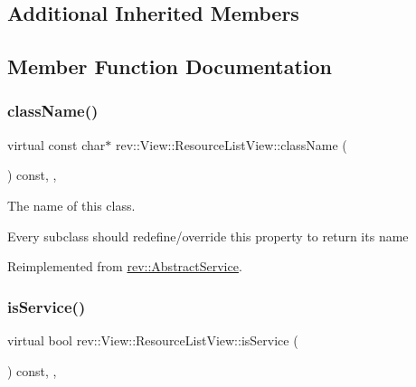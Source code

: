 \subsection*{Additional Inherited Members}


\subsection{Member Function Documentation}
\mbox{\label{classrev_1_1_view_1_1_resource_list_view_a2e12909ec3f4986fb0d2d3edd0987ba6}} 
\subsubsection{\texorpdfstring{className()}{className()}}
{\footnotesize\ttfamily virtual const char$\ast$ rev\+::\+View\+::\+Resource\+List\+View\+::class\+Name (\begin{DoxyParamCaption}{ }\end{DoxyParamCaption}) const\hspace{0.3cm}{\ttfamily [inline]}, {\ttfamily [override]}, {\ttfamily [virtual]}}



The name of this class. 

Every subclass should redefine/override this property to return its name 

Reimplemented from \mbox{\hyperlink{classrev_1_1_abstract_service_a0b64ee4651db7637a70265697ca62453}{rev\+::\+Abstract\+Service}}.

\mbox{\label{classrev_1_1_view_1_1_resource_list_view_a3f9f3fe3bc14956972b7a2aad876dd97}} 
\subsubsection{\texorpdfstring{isService()}{isService()}}
{\footnotesize\ttfamily virtual bool rev\+::\+View\+::\+Resource\+List\+View\+::is\+Service (\begin{DoxyParamCaption}{ }\end{DoxyParamCaption}) const\hspace{0.3cm}{\ttfamily [inline]}, {\ttfamily [override]}, {\ttfamily [virtual]}}



